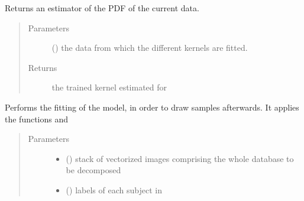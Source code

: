 \documentclass[letterpaper,10pt,english]{sphinxmanual}
\begin{document}
\begin{fulllineitems}

\begin{fulllineitems}
\label{\detokenize{api:brainSimulator.BrainSimulator.estimateDensity}}
Returns an estimator of the PDF of the current data.
\begin{quote}\begin{description}
\item[{Parameters}] \leavevmode
{} () \textendash{} the data from which the different kernels are fitted.

\item[{Returns}] \leavevmode
the trained kernel estimated for 

\end{description}\end{quote}

\end{fulllineitems}


\begin{fulllineitems}
\label{\detokenize{api:brainSimulator.BrainSimulator.fit}}
Performs the fitting of the model, in order to draw samples afterwards.
It applies the functions  and 
\begin{quote}\begin{description}
\item[{Parameters}] \leavevmode\begin{itemize}
\item {} 
 () \textendash{} stack of vectorized images comprising the whole database to be decomposed

\item {} 
 () \textendash{} labels of each subject in 

\end{itemize}

\end{description}\end{quote}


\end{fulllineitems}
\end{fulllineitems}
\end{document}
